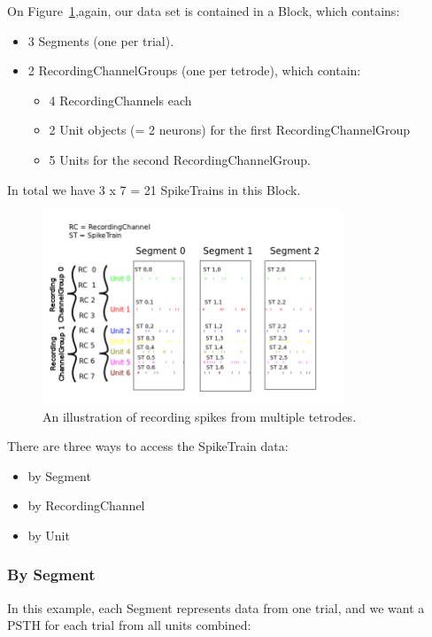 \documentclass{frontiers}
\begin{document}
On Figure~\ref{fig:usecase2},again, our data set is contained in a Block, which contains:

\begin{itemize}
\item 3 Segments (one per trial).
\item 2 RecordingChannelGroups (one per tetrode), which contain:
  \begin{itemize}
  \item 4 RecordingChannels each
  \item 2 Unit objects (= 2 neurons) for the first RecordingChannelGroup
  \item 5 Units for the second RecordingChannelGroup.
  \end{itemize}
\end{itemize}

In total we have 3 x 7 = 21 SpikeTrains in this Block.

\begin{figure}
\centering
\includegraphics[width=0.8\textwidth]{figures/usecase2}
\caption{An illustration of recording spikes from multiple tetrodes.}\label{fig:usecase2} 
\end{figure}



There are three ways to access the SpikeTrain data:
\begin{itemize}
\item by Segment
\item by RecordingChannel
\item by Unit
\end{itemize}

\subsubsection{By Segment}

In this example, each Segment represents data from one trial, and we want a PSTH for each trial from all units combined:
\end{document}
